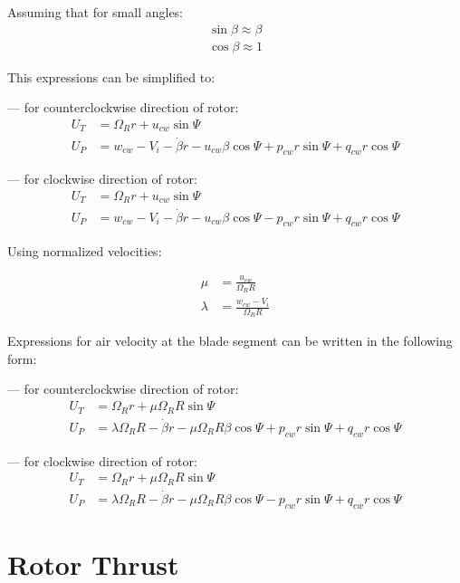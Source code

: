 Assuming that for small angles:
\begin{align}
  \label{eq-aero-sin-beta-approx}
  \sin \beta \approx \beta \\
  \label{eq-aero-cos-beta-approx}
  \cos \beta \approx 1
\end{align}

This expressions can be simplified to:

--- for counterclockwise direction of rotor:
\begin{align}
  U_T &= \Omega_R r + u_{cw} \sin \Psi \\
  U_P &=
  w_{cw} - V_i - \dot \beta r - u_{cw} \beta \cos \Psi
  + p_{cw} r \sin \Psi + q_{cw} r \cos \Psi
\end{align}

--- for clockwise direction of rotor:
  \begin{align}
    U_T &= \Omega_R r + u_{cw} \sin \Psi \\
    U_P &=
    w_{cw} - V_i - \dot \beta r - u_{cw} \beta \cos \Psi
    - p_{cw} r \sin \Psi + q_{cw} r \cos \Psi
  \end{align}

Using normalized velocities:

\begin{align}
  \mu     &= \frac{u_{cw}}{\Omega_R R} \\
  \lambda &= \frac{w_{cw} - V_i}{\Omega_R R}
\end{align}

Expressions for air velocity at the blade segment can be written in the following form:

--- for counterclockwise direction of rotor:
\begin{align}
  U_T &= \Omega_R r + \mu \Omega_R R \sin \Psi \\
  U_P &=
  \lambda \Omega_R R - \dot \beta r - \mu \Omega_R R \beta \cos \Psi
  + p_{cw} r \sin \Psi + q_{cw} r \cos \Psi
\end{align}

--- for clockwise direction of rotor:
\begin{align}
  U_T &= \Omega_R r + \mu \Omega_R R \sin \Psi \\
  U_P &=
  \lambda \Omega_R R - \dot \beta r - \mu \Omega_R R \beta \cos \Psi
  - p_{cw} r \sin \Psi + q_{cw} r \cos \Psi
\end{align}

\section{Rotor Thrust}

